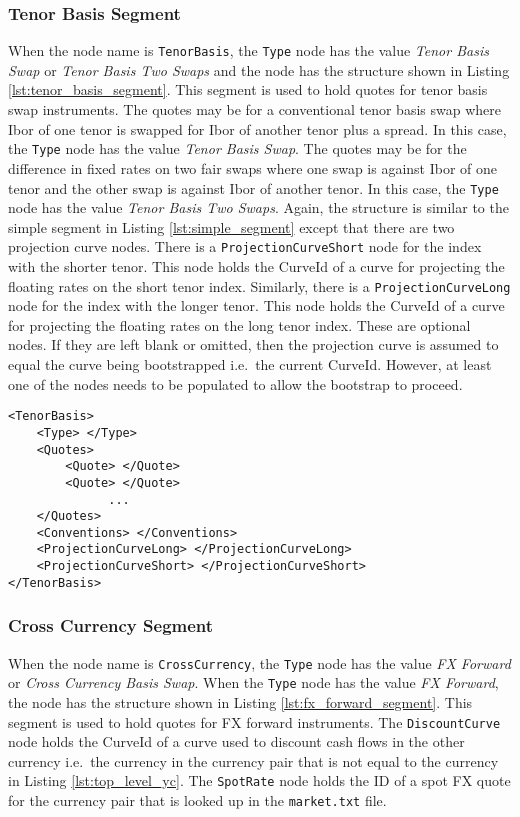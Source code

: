 \subsubsection*{Tenor Basis Segment}
When the node name is \lstinline!TenorBasis!, the \lstinline!Type! node has the value \emph{Tenor Basis Swap} or 
\emph{Tenor Basis Two Swaps} and the node has the structure shown in Listing \ref{lst:tenor_basis_segment}. This segment 
is used to hold quotes for tenor basis swap instruments. The quotes may be for a conventional tenor basis swap where Ibor 
of one tenor is swapped for Ibor of another tenor plus a spread. In this case, the \lstinline!Type! node has the value 
\emph{Tenor Basis Swap}. The quotes may be for the difference in fixed rates on two fair swaps where one swap is against 
Ibor of one tenor and the other swap is against Ibor of another tenor. In this case, the \lstinline!Type! node has the 
value \emph{Tenor Basis Two Swaps}. Again, the structure is similar to the simple segment in Listing 
\ref{lst:simple_segment} except that there are two projection curve nodes. There is a \lstinline!ProjectionCurveShort! 
node for the index with the shorter tenor. This node holds the CurveId of a curve for projecting the floating rates on the 
short tenor index. Similarly, there is a \lstinline!ProjectionCurveLong! node for the index with the longer tenor. This 
node holds the CurveId of a curve for projecting the floating rates on the long tenor index. These are optional nodes. If 
they are left blank or omitted, then the projection curve is assumed to equal the curve being bootstrapped i.e.\ the 
current CurveId. However, at least one of the nodes needs to be populated to allow the bootstrap to proceed.

\begin{lstlisting}[caption=Tenor basis yield curve segment, label=lst:tenor_basis_segment]
<TenorBasis>
	<Type> </Type>
	<Quotes>
		<Quote> </Quote>
		<Quote> </Quote>
		      ...
	</Quotes>
	<Conventions> </Conventions>
	<ProjectionCurveLong> </ProjectionCurveLong>
	<ProjectionCurveShort> </ProjectionCurveShort>
</TenorBasis>
\end{lstlisting}

\subsubsection*{Cross Currency Segment}
When the node name is \lstinline!CrossCurrency!, the \lstinline!Type! node has the value \emph{FX Forward} or \emph{Cross 
Currency Basis Swap}. When the \lstinline!Type! node has the value \emph{FX Forward}, the node has the structure shown in 
Listing \ref{lst:fx_forward_segment}. This segment is used to hold quotes for FX forward instruments. The 
\lstinline!DiscountCurve! node holds the CurveId of a curve used to discount cash flows in the other currency i.e.\ the 
currency in the currency pair that is not equal to the currency in Listing \ref{lst:top_level_yc}. The 
\lstinline!SpotRate! node holds the ID of a spot FX quote for the currency pair that is looked up in the {\tt market.txt} 
file.

